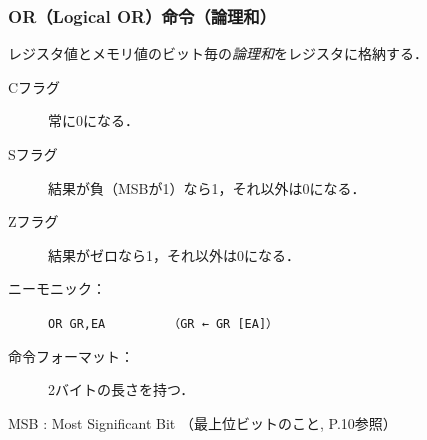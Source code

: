 \documentclass[handout]{beamer}        %
\begin{document}
\begin{frame}
  \frametitle{OR（Logical OR）命令（論理和）}
  レジスタ値とメモリ値のビット毎の\emph{論理和}をレジスタに格納する．
  \vfill
  \begin{description}
  \item[Cフラグ] 常に0になる．
  \item[Sフラグ] 結果が負（MSBが1）なら1，それ以外は0になる．
  \item[Zフラグ] 結果がゼロなら1，それ以外は0になる．
    \vfill
  \item[ニーモニック：]\texttt{OR GR,EA}~~~~~~~~~\texttt{（GR ← GR \textbar{} [EA]）}
    \vfill
  \item[命令フォーマット：] 2バイトの長さを持つ．\\
    {\small{}}
    \vfill
  \end{description}
  \vfill
  MSB : Most Significant Bit （最上位ビットのこと, P.10参照）
  \vfill
\end{frame}
\end{document}
